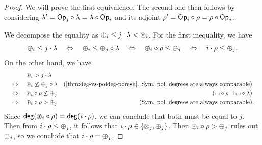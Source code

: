 \documentclass[a4paper]{memoir}
\begin{document}
\begin{proof}
	We will prove the first equivalence. The second one then follows by considering $\lambda' = {\mathsf{Op}}_j \circ \lambda = \lambda \circ {\mathsf{Op}}_i$ and its adjoint $\rho' = {\mathsf{Op}}_i \circ \rho = \rho \circ {\mathsf{Op}}_j$.
	
	We decompose the equality as ${\oplus}_i \leq j \cdot \lambda < {\oast}_i$.
	For the first inequality, we have
	\[
		{\oplus}_i \leq j \cdot \lambda
		\quad\Leftrightarrow\quad
		{\oplus}_i \leq {\oplus}_j \circ \lambda
		\quad\Leftrightarrow\quad
		{\oplus}_i \circ \rho \leq {\oplus}_j
		\quad\Leftrightarrow\quad
		i \cdot \rho \leq {\oplus}_j.
	\]
	On the other hand, we have
	\begin{align*}
		&\quad\mathrel{\phantom{\Leftrightarrow}}\quad
		\isopol_i > j \cdot \lambda
		\\ &\quad\Leftrightarrow\quad
		\isopol_i \not\leq \pospol_j \circ \lambda
		& \text{(\Cref{thm:deg-vs-poldeg-poresh}. Sym.\ pol.\ degrees are always comparable)}
		\\ &\quad\Leftrightarrow\quad
		\isopol_i \circ \rho \not\leq \pospol_j
		& \text{($\loch \circ \rho \dashv \loch \circ \lambda$)}
		\\ &\quad\Leftrightarrow\quad
		\isopol_i \circ \rho > \pospol_j
		& \text{(Sym.\ pol.\ degrees are always comparable)}&.
	\end{align*}
	Since $\mathsf{deg}({\oast}_i \circ \rho) = \mathsf{deg}(i \cdot \rho)$, we can conclude that both must be equal to $j$. Then from $i \cdot \rho \leq {\oplus}_j$, it follows that $i \cdot \rho \in \mathopen{}\left\{ {\otimes}_j, {\oplus}_j \right\}\mathclose{}$.
	Then ${\oast}_i \circ \rho > {\oplus}_j$ rules out ${\otimes}_j$, so we conclude that $i \cdot \rho = {\oplus}_j$.
\end{proof}
\end{document}
